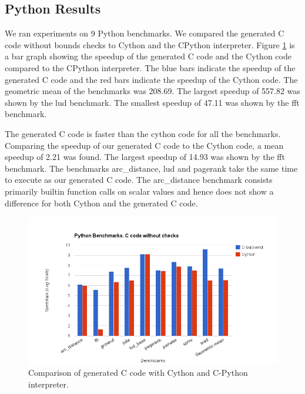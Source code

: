 \subsection{Python Results}
We ran experiments on 9 Python benchmarks. We compared the generated C code without bounds checks to Cython and the CPython interpreter. Figure \ref{fig:results_cwochecks_py} is a bar graph showing the speedup of the generated C code and the Cython code compared to the CPython interpreter. The blue bars indicate the speedup of the generated C code and the red bars indicate the speedup of the Cython code. The geometric mean of the benchmarks was 208.69. The largest speedup of 557.82  was shown by the lud benchmark. The smallest speedup of 47.11 was shown by the fft benchmark. 

The generated C code is faster than the cython code for all the benchmarks. Comparing the speedup of our generated C code to the Cython code, a mean speedup of 2.21 was found. The largest speedup of 14.93 was shown by the fft benchmark. The benchmarks arc\_distance, lud and pagerank take the same time to execute as our generated C code. The arc\_distance benchmark consists primarily builtin function calls on scalar values and hence does not show a difference for both Cython and the generated C code. 
\begin{figure}[htbp]
\centering
\includegraphics[scale=0.5]{Figures/results_cwochecks_py.png}
\caption{Comparison of generated C code with Cython and C-Python interpreter.}
\label{fig:results_cwochecks_py}
\end{figure}
